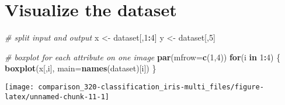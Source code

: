 \documentclass[]{book}
\newenvironment{Shaded}{\begin{snugshade}}{\end{snugshade}}
\newcommand{\CommentTok}[1]{\textcolor[rgb]{0.56,0.35,0.01}{\textit{#1}}}
\newcommand{\ControlFlowTok}[1]{\textcolor[rgb]{0.13,0.29,0.53}{\textbf{#1}}}
\newcommand{\DataTypeTok}[1]{\textcolor[rgb]{0.13,0.29,0.53}{#1}}
\newcommand{\DecValTok}[1]{\textcolor[rgb]{0.00,0.00,0.81}{#1}}
\newcommand{\KeywordTok}[1]{\textcolor[rgb]{0.13,0.29,0.53}{\textbf{#1}}}
\newcommand{\NormalTok}[1]{#1}
\newcommand{\OperatorTok}[1]{\textcolor[rgb]{0.81,0.36,0.00}{\textbf{#1}}}
\newcommand{\StringTok}[1]{\textcolor[rgb]{0.31,0.60,0.02}{#1}}
\begin{document}
\begin{Shaded}
\end{Shaded}

\hypertarget{visualize-the-dataset}{%
\section{Visualize the dataset}\label{visualize-the-dataset}}

\begin{Shaded}
\begin{Highlighting}[]
\CommentTok{# split input and output}
\NormalTok{x <-}\StringTok{ }\NormalTok{dataset[,}\DecValTok{1}\OperatorTok{:}\DecValTok{4}\NormalTok{]}
\NormalTok{y <-}\StringTok{ }\NormalTok{dataset[,}\DecValTok{5}\NormalTok{]}
\end{Highlighting}
\end{Shaded}

\begin{Shaded}
\begin{Highlighting}[]
\CommentTok{# boxplot for each attribute on one image}
\KeywordTok{par}\NormalTok{(}\DataTypeTok{mfrow=}\KeywordTok{c}\NormalTok{(}\DecValTok{1}\NormalTok{,}\DecValTok{4}\NormalTok{))}
\ControlFlowTok{for}\NormalTok{(i }\ControlFlowTok{in} \DecValTok{1}\OperatorTok{:}\DecValTok{4}\NormalTok{) \{}
    \KeywordTok{boxplot}\NormalTok{(x[,i], }\DataTypeTok{main=}\KeywordTok{names}\NormalTok{(dataset)[i])}
\NormalTok{\}}
\end{Highlighting}
\end{Shaded}

\begin{center}\texttt{[image: comparison\_320-classification\_iris-multi\_files/figure-latex/unnamed-chunk-11-1]} \end{center}
\end{document}
